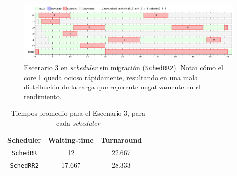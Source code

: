 \begin{figure}[H]
    \begin{center}
        \includegraphics[width=1\columnwidth]{imagenes/ej8_3_rr2.png}
        \caption{Escenario 3 en \emph{scheduler} sin migración
        (\texttt{SchedRR2}). Notar cómo el core 1 queda ocioso rápidamente,
        resultando en una mala distribución de la carga que repercute
        negativamente en el rendimiento.}
    \end{center}
\end{figure}

\begin{table}[H]
    \begin{center}
        \begin{tabular}{|c|c|c|c|}
            \hline
            \textbf{Scheduler} & \textbf{Waiting-time} & \textbf{Turnaround} \\ \hline
            \texttt{SchedRR}   & 12                    & 22.667 \\
            \texttt{SchedRR2}  & 17.667                & 28.333 \\ \hline
        \end{tabular}
        \caption{Tiempos promedio para el Escenario 3, para cada \emph{scheduler}}
    \end{center}
\end{table}
